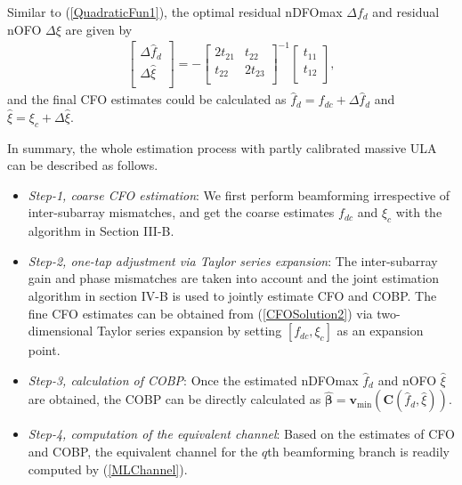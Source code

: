 \documentclass[12pt, draftclsnofoot, onecolumn]{IEEEtran}
\begin{document}
Similar to (\ref{QuadraticFun1}), the optimal residual nDFOmax $\Delta {{f}_{d}}$ and residual nOFO $\Delta \xi $ are given by
\begin{align}\label{CFOSolution2}
\left[ \begin{matrix}
   \Delta \hat{f}_{d}  \\
   \Delta \hat{\xi}  \\
\end{matrix} \right]=-{{\left[ \begin{matrix}
   2{{t}_{21}} & {{t}_{22}}  \\
   {{t}_{22}} & 2{{t}_{23}}  \\
\end{matrix} \right]}^{-1}}\left[ \begin{matrix}
   {{t}_{11}}  \\
   {{t}_{12}}  \\
\end{matrix} \right],
\end{align}
and the final CFO estimates could be calculated as ${{\hat{f}}_{d}}={{f}_{dc}}+\Delta {\hat{f}_{d}}$ and $\hat{\xi }={{\xi }_{c}}+\Delta \hat{\xi} $.

In summary, the whole estimation process with partly calibrated massive ULA can be described as follows.
\begin{itemize}
  \item \emph{Step-1, coarse CFO estimation}: We first perform beamforming irrespective of inter-subarray mismatches, and get the coarse estimates ${f}_{dc}$ and ${\xi}_{c}$ with the algorithm in Section III-B.
  \item \emph{Step-2, one-tap adjustment via Taylor series expansion}: The inter-subarray gain and phase mismatches are taken into account and the joint estimation algorithm in section IV-B is used to jointly estimate CFO and COBP. The fine CFO estimates can be obtained from (\ref{CFOSolution2}) via two-dimensional Taylor series expansion by setting $\left[ {f}_{dc}, {\xi}_{c} \right]$ as an expansion point.
  \item \emph{Step-3, calculation of COBP}: Once the estimated nDFOmax ${{\hat{f}}_{d}}$ and nOFO $\hat{\xi }$ are obtained, the COBP can be directly calculated as $\boldsymbol{\hat{\beta }}={{\mathbf{v}}_{\min }}\left( \mathbf{C}\left( {{{\hat{f}}}_{d}}, \hat{\xi } \right) \right)$.
  \item \emph{Step-4, computation of the equivalent channel}: Based on the estimates of CFO and COBP, the equivalent channel for the $q$th beamforming branch is readily computed by (\ref{MLChannel}).
\end{itemize}
\end{document}
